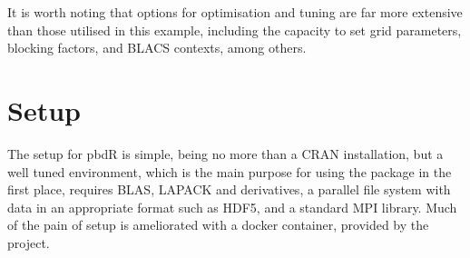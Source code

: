 \documentclass[a4paper,10pt]{article}
\begin{document}
It is worth noting that options for optimisation and tuning are far more
extensive than those utilised in this example, including the capacity to set
grid parameters, blocking factors, and BLACS contexts, among others.

\section{Setup}

The setup for pbdR is simple, being no more than a CRAN installation, but a
well tuned environment, which is the main purpose for using the package in the
first place, requires BLAS, LAPACK and derivatives, a parallel file system with
data in an appropriate format such as HDF5, and a standard MPI library. Much of
the pain of setup is ameliorated with a docker container, provided by the
project.

\printbibliography{}
\end{document}
